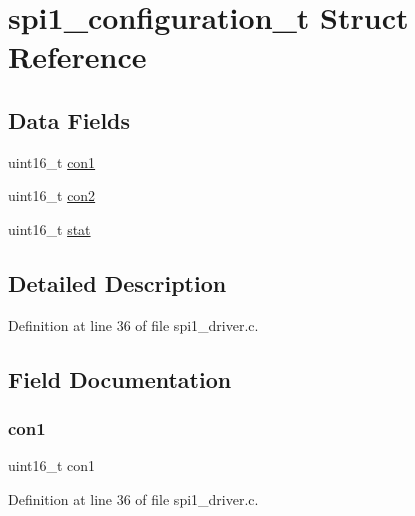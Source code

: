 \hypertarget{structspi1__configuration__t}{}\section{spi1\+\_\+configuration\+\_\+t Struct Reference}
\label{structspi1__configuration__t}
\subsection*{Data Fields}
\begin{DoxyCompactItemize}
\item 
uint16\+\_\+t \mbox{\hyperlink{structspi1__configuration__t_a6e04ca44cd2148e6b847173b08bcecfe}{con1}}
\item 
uint16\+\_\+t \mbox{\hyperlink{structspi1__configuration__t_acc03e2997dde98ddb6ddc5c30f633d13}{con2}}
\item 
uint16\+\_\+t \mbox{\hyperlink{structspi1__configuration__t_a9ebb6eed90bd90fa99f9cf9e1f6c69fd}{stat}}
\end{DoxyCompactItemize}


\subsection{Detailed Description}


Definition at line 36 of file spi1\+\_\+driver.\+c.



\subsection{Field Documentation}
\mbox{\label{structspi1__configuration__t_a6e04ca44cd2148e6b847173b08bcecfe}} 
\subsubsection{\texorpdfstring{con1}{con1}}
{\footnotesize\ttfamily uint16\+\_\+t con1}



Definition at line 36 of file spi1\+\_\+driver.\+c.

\mbox{\label{structspi1__configuration__t_acc03e2997dde98ddb6ddc5c30f633d13}} 
